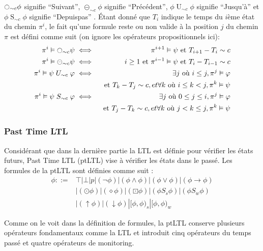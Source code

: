 $\fullmoon_{\sim{}c}\phi$ signifie ``Suivant'', $\circleddash_{\sim{}c}\phi$ signifie ``Précédent'', $\phi \mathrel{U}_{\sim{}c} \phi$ signifie ``Jusqu'à'' et $\phi \mathrel{S}_{\sim{}c} \phi$ signifie ``Depuispas'' \citep{chang1994compositional}. Étant donné que $T_i$ indique le temps du $i$ème état du chemin $\pi^i$, le fait qu'une formule reste ou non valide à la position $j$ du chemin $\pi$ est défini comme suit (on ignore les opérateurs propositionnels ici):
\begin{eqnarray*}
\pi^i \vDash \fullmoon_{\sim{}c}\psi & \iff & \pi^{i+1} \vDash \psi \mbox{ et } T_{i+1} - T_i \sim c \\
\pi^i \vDash \circleddash_{\sim{}c}\psi & \iff & i \geq 1 \mbox{ et } \pi^{i-1} \vDash \psi \mbox{ et } T_i - T_{i-1} \sim c \\
\pi^i \vDash \psi \mathrel{U}_{\sim{}c} \varphi & \iff & \exists j \mbox{ où } i \leq j, \pi^j \vDash \varphi \\ & & \mbox{ et } T_k - T_j \sim c, et \forall k \mbox{ où } i \leq k < j, \pi^k \vDash \psi \\
\pi^i \vDash \psi \mathrel{S}_{\sim{}c} \varphi & \iff & \exists j \mbox{ où } 0 \leq j \leq i, \pi^j \vDash \varphi \\ & & \mbox{ et } T_j - T_k \sim c, et \forall k \mbox{ où } j < k \leq j, \pi^k \vDash \psi \\
\end{eqnarray*}

\subsubsection{Past Time LTL}

Considérant que dans la dernière partie la LTL est définie pour vérifier les états futurs, Past Time LTL (ptLTL) vise à vérifier les états dans le passé. Les formules de la ptLTL sont définies comme suit \citep{havelund2004efficient}:
\begin{align*}
\phi ::= & \top | \bot | p | (\neg\phi) | (\phi \wedge \phi) | (\phi \vee \phi) | (\phi \rightarrow \phi) \\
& | (\odot \phi) | (\diamond \phi) | (\boxdot \phi) | (\phi \mathrel{S_s} \phi) | (\phi \mathrel{S_w} \phi) \\
& | (\uparrow \phi) | (\downarrow \phi) | [\phi, \phi)_s | [\phi, \phi)_w
\end{align*}

Comme on le voit dans la définition de formules, la ptLTL conserve plusieurs opérateurs fondamentaux comme la LTL et introduit cinq opérateurs du temps passé et quatre opérateurs de monitoring.


